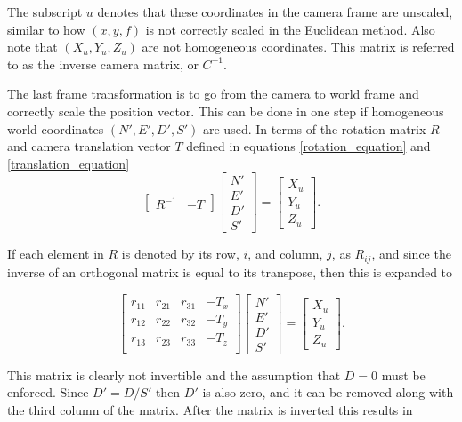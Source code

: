   The subscript $u$ denotes that these coordinates in the camera frame are unscaled, similar to how $(x,y,f)$ is not correctly scaled in the Euclidean method.  Also note that $(X_u, Y_u, Z_u)$ are not homogeneous coordinates.  This matrix is referred to as the inverse camera matrix, or $C^{-1}$. 
  
  The last frame transformation is to go from the camera to world frame and correctly scale the position vector.  This can be done in one step if homogeneous world coordinates $(N',E',D',S')$ are used.  In terms of the rotation matrix $R$ and camera translation vector $T$ defined in equations \ref{rotation_equation} and \ref{translation_equation}  
     \[
     \begin{bmatrix} R^{-1} & -T \end{bmatrix}
     \begin{bmatrix} N' \\ E' \\ D' \\ S' \end{bmatrix}
     =
     \begin{bmatrix} X_u \\ Y_u \\ Z_u \end{bmatrix}
     .
     \]
     
 If each element in $R$ is denoted by its row, $i$, and column, $j$, as $R_{ij}$, and since the inverse of an orthogonal matrix is equal to its transpose, then this is expanded to
 
      \[
      \begin{bmatrix} r_{11} & r_{21} & r_{31} & -T_x \\
                      r_{12} & r_{22} & r_{32} & -T_y \\
                      r_{13} & r_{23} & r_{33} & -T_z \\
      \end{bmatrix}
      \begin{bmatrix} N' \\ E' \\ D' \\ S' \end{bmatrix}
      =
      \begin{bmatrix} X_u \\ Y_u \\ Z_u \end{bmatrix}
      .
      \]
      
  This matrix is clearly not invertible and the assumption that $D=0$ must be enforced.  Since $D'=D/S'$ then $D'$ is also zero, and it can be removed along with the third column of the matrix.   After the matrix is inverted this results in 
  

